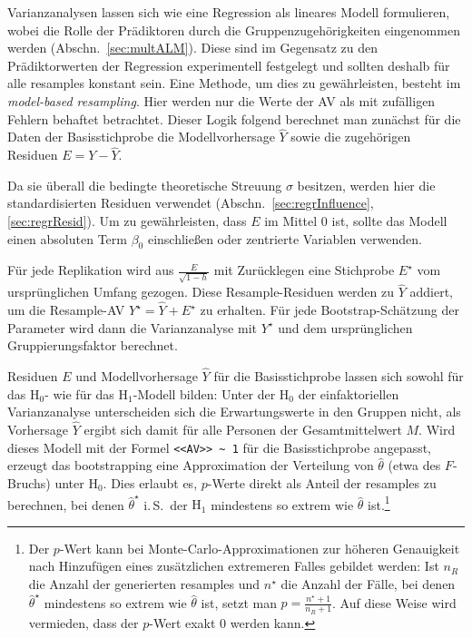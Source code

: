 
Varianzanalysen lassen sich wie eine Regression als lineares Modell formulieren, wobei die Rolle der Prädiktoren durch die Gruppenzugehörigkeiten eingenommen werden (Abschn.\ \ref{sec:multALM}). Diese sind im Gegensatz zu den Prädiktorwerten der Regression experimentell festgelegt und sollten deshalb für alle resamples konstant sein. Eine Methode, um dies zu gewährleisten, besteht im \emph{model-based resampling}. Hier werden nur die Werte der AV als mit zufälligen Fehlern behaftet betrachtet. Dieser Logik folgend berechnet man zunächst für die Daten der Basisstichprobe die Modellvorhersage $\hat{Y}$ sowie die zugehörigen Residuen $E = Y - \hat{Y}$.

Da sie überall die bedingte theoretische Streuung $\sigma$ besitzen, werden hier die standardisierten Residuen verwendet (Abschn.\ \ref{sec:regrInfluence}, \ref{sec:regrResid}). Um zu gewährleisten, dass $E$ im Mittel $0$ ist, sollte das Modell einen absoluten Term $\beta_{0}$ einschließen oder zentrierte Variablen verwenden.

Für jede Replikation wird aus $\frac{E}{\sqrt{1-h}}$ mit Zurücklegen eine Stichprobe $E^{\star}$ vom ursprünglichen Umfang gezogen. Diese Resample-Residuen werden zu $\hat{Y}$ addiert, um die Resample-AV $Y^{\star} = \hat{Y} + E^{\star}$ zu erhalten. Für jede Bootstrap-Schätzung der Parameter wird dann die Varianzanalyse mit $Y^{\star}$ und dem ursprünglichen Gruppierungsfaktor berechnet.

Residuen $E$ und Modellvorhersage $\hat{Y}$ für die Basisstichprobe lassen sich sowohl für das $\text{H}_{0}$- wie für das $\text{H}_{1}$-Modell bilden: Unter der $\text{H}_{0}$ der einfaktoriellen Varianzanalyse unterscheiden sich die Erwartungswerte in den Gruppen nicht, als Vorhersage $\hat{Y}$ ergibt sich damit für alle Personen der Gesamtmittelwert $M$. Wird dieses Modell mit der Formel \lstinline!<<AV>> ~ 1! für die Basisstichprobe angepasst, erzeugt das bootstrapping eine Approximation der Verteilung von $\hat{\theta}$ (etwa des $F$-Bruchs) unter $\text{H}_{0}$. Dies erlaubt es, $p$-Werte direkt als Anteil der resamples zu berechnen, bei denen $\hat{\theta}^{\star}$ i.\,S.\ der $\text{H}_{1}$ mindestens so extrem wie $\hat{\theta}$ ist.\footnote{\label{ftn:bootP}Der $p$-Wert kann bei Monte-Carlo-Approximationen zur höheren Genauigkeit nach Hinzufügen eines zusätzlichen extremeren Falles gebildet werden: Ist $n_{R}$ die Anzahl der generierten resamples und $n^{\star}$ die Anzahl der Fälle, bei denen $\hat{\theta}^{\star}$ mindestens so extrem wie $\hat{\theta}$ ist, setzt man $p = \frac{n^{\star} + 1}{n_{R} + 1}$. Auf diese Weise wird vermieden, dass der $p$-Wert exakt $0$ werden kann.}

